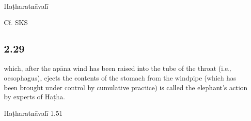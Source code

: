 \begin{ekdosis}
\begin{testimonia}[hp02_028]
Haṭharatnāvalī

\begin{versinnote}
\end{versinnote}

Cf. SKS

\begin{versinnote}
\end{versinnote}
\end{testimonia}

\begin{philcomm}[hp02_028]
\end{philcomm}

\subsection*{2.29}
\begin{translation} which, after the apāna wind has been raised into the tube of the throat (i.e., oesophagus), ejects the contents of the stomach from the windpipe (which has been brought under control by cumulative practice) is called the elephant’s action by experts of Haṭha.
\end{translation}

\begin{sources}[hp02_029]
\end{sources}

\begin{testimonia}[hp02_029]
Haṭharatnāvalī 1.51

\begin{versinnote}
\end{versinnote}


\end{testimonia}
\end{ekdosis}
